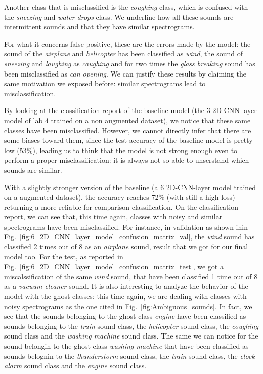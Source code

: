 \documentclass{article}
\begin{document}
\begin{sloppy}
Another class that is misclassified is the \textit{coughing} class, which is confused with the 
\textit{sneezing} and \textit{water drops} class. We underline how all these sounds are intermittent sounds
and that they have similar spectrograms.

For what it concerns false positive, these are the errors made by the model: the sound of the \textit{airplane} and
\textit{helicopter} has been classified as \textit{wind}, the sound of \textit{sneezing} and \textit{laughing} as \textit{caughing}
and for two times the \textit{glass breaking} sound has been misclassified as \textit{can opening}. We can justify
these results by claiming the same motivation we exposed before: similar spectrograms lead to misclassification.

By looking at the classification report of the baseline model (the 3 2D-CNN-layer model of lab 4 trained on a non augmented dataset),
we notice that these same classes have been misclassified. However,
we cannot directly infer that there are some biases toward them, since the test accuracy of the baseline model is pretty low (53\%),
leading us to think that the model is not strong enough even to perform a proper misclassification: it is always not so able to
unserstand which sounds are similar.

With a slightly stronger version of the baseline (a 6 2D-CNN-layer model trained on a augmented dataset), the accuracy
reaches 72\% (with still a high loss) returning a more reliable for comparison classification. On the classification report,
we can see that, this time again, classes with noisy and similar spectrograms have been misclassified. For instance, in validation as shown inin Fig.~\ref{fig:6_2D_CNN_layer_model_confusion_matrix_val},
the \textit{wind} sound has classified 2 times out of 8 as an \textit{airplane} sound, result that we got for our final model too.
For the test, as reported in Fig.~\ref{fig:6_2D_CNN_layer_model_confusion_matrix_test}, we got a miscalssification of the same \textit{wind} sound, that have been classified 1 time out of 8 as a \textit{vacuum cleaner} sound.
It is also interesting to analyze the behavior of the model with the ghost classes: this time again, we are dealing with classes
with noisy spectrograms as the one cited in Fig.~\ref{fig:Ambiguous_sounds}. In fact, we see that the sounds belonging to the ghost class \textit{engine} have been classified as
sounds belonging to the \textit{train} sound class, the \textit{helicopter} sound class, the \textit{coughing} sound class and the \textit{washing machine} sound class.
The same we can notice for the sound belongin to the ghost class \textit{washing machine} that have been classified as
sounds belognin to the \textit{thunderstorm} sound class, the \textit{train} sound class, the \textit{clock alarm} sound class and the \textit{engine} sound class.


\end{sloppy}
\end{document}
